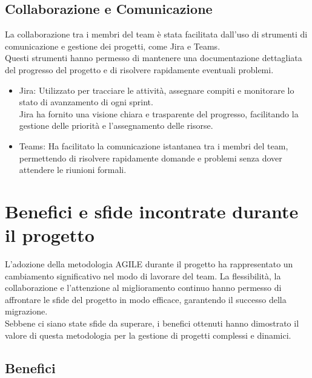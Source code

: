 \subsection{Collaborazione e Comunicazione}
\label{sub:comunicazione}

La collaborazione tra i membri del team è stata facilitata dall'uso di strumenti
di comunicazione e gestione dei progetti, come Jira e Teams.\\ Questi strumenti hanno
permesso di mantenere una documentazione dettagliata del progresso del progetto e
di risolvere rapidamente eventuali problemi.
\begin{itemize}
  \item Jira: Utilizzato per tracciare le attività, assegnare compiti e monitorare
    lo stato di avanzamento di ogni sprint.\\ Jira ha fornito una visione chiara
    e trasparente del progresso, facilitando la gestione delle priorità e l'assegnamento
    delle risorse.

  \item Teams: Ha facilitato la comunicazione istantanea tra i membri del team, permettendo
    di risolvere rapidamente domande e problemi senza dover attendere le riunioni
    formali.
\end{itemize}

\section{Benefici e sfide incontrate durante il progetto}
\label{sec:benefici_sfide_agile}

L'adozione della metodologia AGILE durante il progetto ha rappresentato un
cambiamento significativo nel modo di lavorare del team. La flessibilità, la
collaborazione e l'attenzione al miglioramento continuo hanno permesso di
affrontare le sfide del progetto in modo efficace, garantendo il successo della migrazione.\\
Sebbene ci siano state sfide da superare, i benefici ottenuti hanno dimostrato
il valore di questa metodologia per la gestione di progetti complessi e dinamici.

\subsection{Benefici}
\label{sub:benefici}

